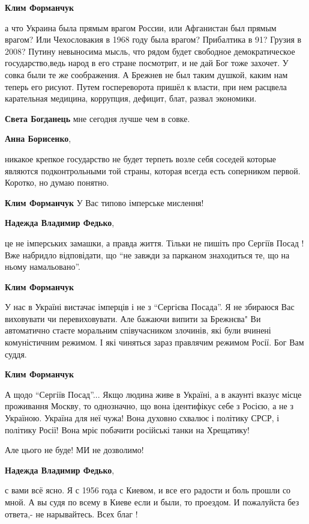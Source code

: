 \begin{itemize}
\begin{itemize}
\begin{itemize}
\textbf{Клим Форманчук} 

а что Украина была прямым врагом России, или Афганистан был прямым врагом? Или
Чехословакия в 1968 году была врагом? Прибалтика в 91? Грузия в 2008? Путину
невыносима мысль, что рядом будет свободное демократическое государство,ведь
народ в его стране посмотрит, и не дай Бог тоже захочет. У совка были те же
соображения. А Брежнев не был таким душкой, каким нам теперь его рисуют. Путем
госпереворота пришёл к власти, при нем расцвела карательная медицина,
коррупция, дефицит, блат, развал экономики.


\textbf{Света Богданець} мне сегодня лучше чем в совке.

\textbf{Анна Борисенко}, 

никакое крепкое государство не будет терпеть возле себя соседей которые
являются подконтрольными той страны, которая всегда есть соперником первой.
Коротко, но думаю понятно.


\textbf{Клим Форманчук} У Вас типово імперське мислення!

\textbf{Надежда Владимир Федько}, 

це не імперських замашки, а правда життя. Тільки не пишіть про Сергіїв Посад !
Вже набридло відповідати, що \enquote{не завжди за парканом знаходиться те, що на ньому
намальовано}.

\textbf{Клим Форманчук} 

У нас в Україні вистачає імперців і не з \enquote{Сергієва Посада}. Я не збираюся Вас
виховувати чи перевиховувати. Але бажаючи випити за Брежнєва" Ви автоматично
стаєте моральним співучасником злочинів, які були вчинені комуністичним
режимом. І які чиняться зараз правлячим режимом Росії. Бог Вам суддя.

\textbf{Клим Форманчук} 

А щодо \enquote{Сергіїв Посад}... Якщо людина живе в Україні, а в акаунті вказує місце
проживання Москву, то однозначно, що вона ідентифікує себе з Росією, а не з
Україною. Україна для неї чужа! Вона духовно схвалює і політику СРСР, і
політику Росії! Вона мріє побачити російські танки на Хрещатику!

Але цього не буде! МИ не дозволимо!

\textbf{Надежда Владимир Федько}, 

с вами всё ясно. Я с 1956 года с Киевом, и все его радости и боль прошли со
мной. А вы судя по всему в Киеве если и были, то проездом. И пожалуйста без
ответа,- не нарывайтесь. Всех благ !


\end{itemize}
\end{itemize}
\end{itemize}
